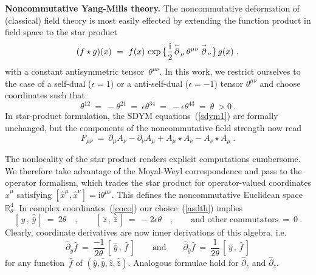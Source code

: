 \documentclass[a4paper,11pt]{article}
\numberwithin{equation}{section}
\def\eps{\epsilon}
\def\th{\theta}
\newcommand{\R}{\mathbb R}
\def\i{\mbox{i}}
\def\pa{\mbox{$\partial$}}
\def\sfrac#1#2{{\textstyle\frac{#1}{#2}}}
\def\rd#1{\buildrel{_{_{\hskip 0.01in}\rightarrow}}\over{#1}}
\def\ld#1{\buildrel{_{_{\hskip 0.01in}\leftarrow}}\over{#1}}
\newcommand{\fh}{\hat{f}}
\begin{document}
\noindent
{\bf Noncommutative Yang-Mills theory.}
The noncommutative deformation of (classical) field theory is most easily
effected by extending the function product in field space to the star product
\begin{equation}
(f \star g)(x)\ =\ f(x)\,\exp\,\bigl\{ \frac{\i}{2}
{\ld{\partial}}_\mu \,\theta^{\mu\nu}\, {\rd{\partial}}_\nu \bigr\}\,g(x) \ ,
\end{equation}
with a constant antisymmetric tensor~$\th^{\mu\nu}$.
In this work, we restrict ourselves to the case of a self-dual ($\eps =1$) or
a anti-self-dual ($\eps =-1$) tensor $\th^{\mu\nu}$ and 
choose coordinates such that
\begin{equation} \label{asdth}
\th^{12}\ =\ -\th^{21}\ =\ \eps\th^{34}\ =\ -\eps\th^{43}\ =\ \th\ >0 \ .
\end{equation}
In star-product formulation, the SDYM equations~(\ref{sdym1}) are formally 
unchanged, but the components of the noncommutative field strength now read
\begin{equation}
{}F_{\mu\nu}\ =\ \pa_\mu A_\nu-\pa_\nu A_\mu+A_\mu\star A_\nu-A_\nu\star A_\mu\ .
\end{equation}

The nonlocality of the star product renders explicit computations cumbersome.
We therefore take advantage of the Moyal-Weyl correspondence and
pass to the operator formalism,
which trades the star product for operator-valued coordinates
$\hat{x}^\mu$ satisfying $[\hat{x}^\mu,\hat{x}^\nu]=\i\theta^{\mu\nu}$.
This defines the noncommutative Euclidean space $\R_\th^4$.
In complex coordinates~(\ref{coco}) our choice~(\ref{asdth}) implies
\begin{equation} \label{ncco}
[\,\hat{y}\,,\,\hat{\bar{y}}\,]\ =\ 2\th \quad,\qquad
[\,\hat{z}\,,\,\hat{\bar{z}}\,]\ =\ -2\eps\th \quad,\qquad
\textrm{and other commutators}\ =\ 0 \ .
\end{equation}
Clearly, coordinate derivatives are now inner derivations of this algebra, i.e.
\begin{equation}\label{code}
\hat{\pa}_y \fh\ =\ \sfrac{-1}{2\th}\,[\,\hat{\bar y}\,,\,\fh\,] 
\qquad\textrm{and}\qquad
\hat{\pa}_{\bar y} \fh\ =\ \sfrac{1}{2\th}\,[\,\hat{y}\,,\,\fh\,] 
\end{equation}
for any function~$\fh$ of $(\hat y,\hat{\bar y},\hat z,\hat{\bar z})$.
Analogous formulae hold for $\hat{\pa}_z$ and $\hat{\pa}_{\bar z}$.
\end{document}
